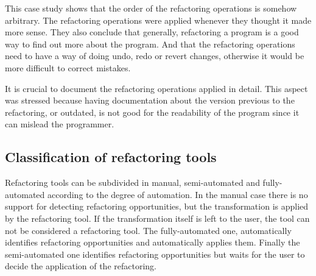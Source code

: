 This case study shows that the order of the refactoring operations is somehow arbitrary.
The refactoring operations were applied whenever they thought it made more sense.
They also conclude that generally, refactoring a program is a good way to find out more about the program. 
And that the refactoring operations need to have a way of doing undo, redo or revert changes, otherwise it would be more difficult to correct mistakes.

It is crucial to document the refactoring operations applied in detail. 
This aspect was stressed because having documentation about the version previous to the refactoring, or outdated, is not good for the readability of the program since it can mislead the programmer.


\subsection{Classification of refactoring tools} %
Refactoring tools can be subdivided in manual, semi-automated and fully-automa\-ted according to the degree of automation.
In the manual case there is no support for detecting refactoring opportunities, but the transformation is applied by the refactoring tool. If the transformation itself is left to the user, the tool can not be considered a refactoring tool.
The fully-automated one, automatically identifies refactoring opportunities and automatically applies them.
Finally the semi-automated one identifies refactoring opportunities but waits for the user to decide the application of the refactoring.






